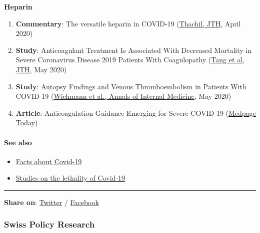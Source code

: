 \textbf{Heparin}

\begin{enumerate}
\def\labelenumi{\arabic{enumi}.}
\tightlist
\item
  \textbf{Commentary}: The versatile heparin in COVID‐19
  (\href{https://onlinelibrary.wiley.com/doi/10.1111/jth.14821}{Thachil,
  JTH}, April 2020)
\item
  \textbf{Study}: Anticoagulant Treatment Is Associated With Decreased
  Mortality in Severe Coronavirus Disease 2019 Patients With
  Coagulopathy (\href{https://pubmed.ncbi.nlm.nih.gov/32220112/}{Tang et
  al, JTH}, May 2020)
\item
  \textbf{Study}: Autopsy Findings and Venous Thromboembolism in
  Patients With COVID-19
  (\href{https://www.acpjournals.org/doi/10.7326/M20-2003}{Wichmann et
  al., Annals of Internal Medicine}, May 2020)
\item
  \textbf{Article}: Anticoagulation Guidance Emerging for Severe
  COVID-19
  (\href{https://www.medpagetoday.com/infectiousdisease/covid19/85865}{Medpage
  Today})
\end{enumerate}

\hypertarget{see-also}{%
\paragraph{See also}\label{see-also}}

\begin{itemize}
\tightlist
\item
  \href{https://swprs.org/a-swiss-doctor-on-covid-19/}{Facts about
  Covid-19}
\item
  \href{https://swprs.org/studies-on-covid-19-lethality/}{Studies on the
  lethality of Covid-19}
\end{itemize}

\begin{center}\rule{0.5\linewidth}{\linethickness}\end{center}

\textbf{Share on}:
\href{https://twitter.com/intent/tweet?url=https://swprs.org/on-the-treatment-of-covid-19/}{Twitter}
/
\href{https://www.facebook.com/share.php?u=https://swprs.org/on-the-treatment-of-covid-19/}{Facebook}

\hypertarget{swiss-policy-research}{%
\subsubsection{Swiss Policy Research}\label{swiss-policy-research}}

